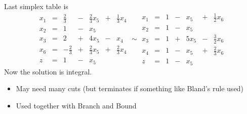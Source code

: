 \documentclass[11pt]{article}
\begin{document}
Last simplex table is
\[
\begin{array}{ccccccc} 
x_1  &   =  &  \frac{2}{3}  &-& \frac{2}{3}x_5 &+&  \frac{1}{3}x_4 \\
x_2  &   =  &  1  &-& x_5 & &    \\
x_3  &   =  &  2  &+& 4 x_5 &-&  x_4  \\
x_6  &  =   & -\frac{2}{3}  &+& \frac23 x_5 &+& \frac{2}3 x_4  \\
z   &   =     &  1  &-  & x_5 & & 
\end{array}
\sim
\begin{array}{ccccccc} 
x_1  &   =  &  1  &-& x_5 &+&  \frac{1}{2}x_6 \\
x_2  &   =  &  1  &-& x_5 & &    \\
x_3  &   =  &  1  &+& 5 x_5 &-&  \frac32x_6  \\
x_4  &  =   & 1  &-&  x_5 &+& \frac{2}3 x_6  \\
z   &   =     &  1  &-  & x_5 & & 
\end{array}
\]
Now the solution is integral.

\begin{itemize}
\item May need many cuts (but terminates if something like Bland's rule used)
\item Used together with Branch and Bound
\end{itemize}


\end{document}
